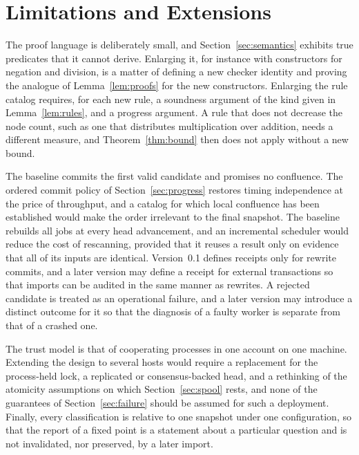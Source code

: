 \documentclass[11pt,a4paper]{article}
\theoremstyle{plain}
\theoremstyle{definition}
\theoremstyle{remark}
\theoremstyle{definition}
\begin{document}
\section{Limitations and Extensions}
\label{sec:limits}

The proof language is deliberately small, and Section~\ref{sec:semantics} exhibits true predicates that it cannot derive. Enlarging it, for instance with constructors for negation and division, is a matter of defining a new checker identity and proving the analogue of Lemma~\ref{lem:proofs} for the new constructors. Enlarging the rule catalog requires, for each new rule, a soundness argument of the kind given in Lemma~\ref{lem:rules}, and a progress argument. A rule that does not decrease the node count, such as one that distributes multiplication over addition, needs a different measure, and Theorem~\ref{thm:bound} then does not apply without a new bound.

The baseline commits the first valid candidate and promises no confluence. The ordered commit policy of Section~\ref{sec:progress} restores timing independence at the price of throughput, and a catalog for which local confluence has been established would make the order irrelevant to the final snapshot. The baseline rebuilds all jobs at every head advancement, and an incremental scheduler would reduce the cost of rescanning, provided that it reuses a result only on evidence that all of its inputs are identical. Version~0.1 defines receipts only for rewrite commits, and a later version may define a receipt for external transactions so that imports can be audited in the same manner as rewrites. A rejected candidate is treated as an operational failure, and a later version may introduce a distinct outcome for it so that the diagnosis of a faulty worker is separate from that of a crashed one.

The trust model is that of cooperating processes in one account on one machine. Extending the design to several hosts would require a replacement for the process-held lock, a replicated or consensus-backed head, and a rethinking of the atomicity assumptions on which Section~\ref{sec:spool} rests, and none of the guarantees of Section~\ref{sec:failure} should be assumed for such a deployment. Finally, every classification is relative to one snapshot under one configuration, so that the report of a fixed point is a statement about a particular question and is not invalidated, nor preserved, by a later import.

\appendix
\end{document}
